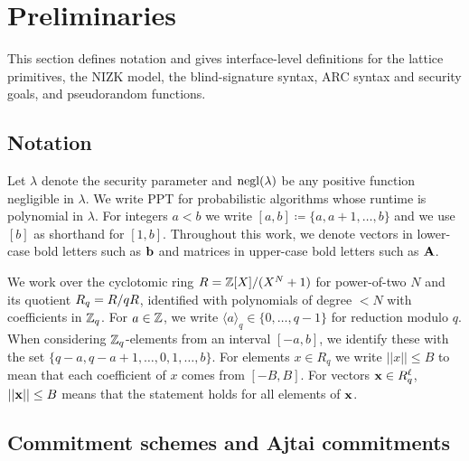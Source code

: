 \section{Preliminaries}
\label{sec:preliminaries}

This section defines notation and gives interface-level definitions for the lattice primitives, the NIZK model, the
blind-signature syntax, ARC syntax and security goals, and pseudorandom functions.



\subsection{Notation}
Let $\lambda$ denote the security parameter and  \(\mathrm{negl}(\lambda)\) be any positive function negligible in  \(\lambda\). We write PPT for
probabilistic algorithms whose runtime is polynomial in \(\lambda\). For integers \(a<b\) we write
\([a,b]\coloneqq\{a,a+1,\ldots,b\}\) and we use \([b]\) as shorthand for \([1,b]\). Throughout this work, we denote vectors in lower-case bold letters such as $\mathbf{b}$ and matrices in upper-case bold letters such as $\mathbf{A}$.

We work over the cyclotomic ring \(R=\mathbb{Z}[X]/(X^N+1)\) for power-of-two \(N\) and its quotient \(R_q=R/qR\), identified
with polynomials of degree \(<N\) with coefficients in \(\mathbb{Z}_q\). For \(a\in\mathbb{Z}\), we write \(\langle a\rangle_q\in\{0,\dots,q-1\}\)
for reduction modulo \(q\). When considering $\mathbb{Z}_q$-elements from an interval \([-a,b]\), we identify these with the set  $\{q-a,q-a+1,\dots,0,1,\dots,b\}$.
For elements $x\in R_q$ we write $||x||\leq B$ to mean that each coefficient of $x$ comes from $[-B,B]$. For vectors $\mathbf{x}\in R_q^\ell$, $||\mathbf{x}||\leq B$ means that the statement holds for all elements of $\mathbf{x}$.

\subsection{Commitment schemes and Ajtai commitments}
\label{subsec:prelim-commit}
\label{subsec:commitments}

